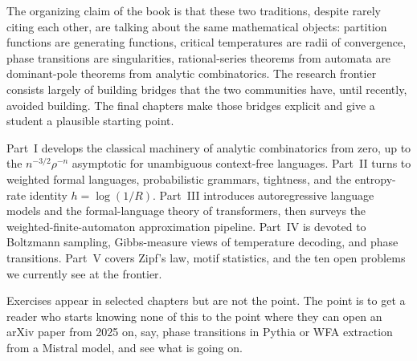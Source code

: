 \documentclass[11pt,a4paper]{book}
\begin{document}
The organizing claim of the book is that these two traditions, despite rarely
citing each other, are talking about the same mathematical objects: partition
functions are generating functions, critical temperatures are radii of
convergence, phase transitions are singularities, rational-series theorems
from automata are dominant-pole theorems from analytic combinatorics. The
research frontier consists largely of building bridges that the two communities
have, until recently, avoided building. The final chapters make those bridges
explicit and give a student a plausible starting point.

Part~I develops the classical machinery of analytic combinatorics from zero,
up to the $n^{-3/2}\rho^{-n}$ asymptotic for unambiguous context-free
languages. Part~II turns to weighted formal languages, probabilistic grammars,
tightness, and the entropy-rate identity $h = \log(1/R)$. Part~III introduces
autoregressive language models and the formal-language theory of transformers,
then surveys the weighted-finite-automaton approximation pipeline. Part~IV is
devoted to Boltzmann sampling, Gibbs-measure views of temperature decoding, and
phase transitions. Part~V covers Zipf's law, motif statistics, and the ten open
problems we currently see at the frontier.

Exercises appear in selected chapters but are not the point. The point is to get
a reader who starts knowing none of this to the point where they can open an
arXiv paper from 2025 on, say, phase transitions in Pythia or WFA extraction
from a Mistral model, and see what is going on.

\mainmatter






\backmatter

\end{document}
